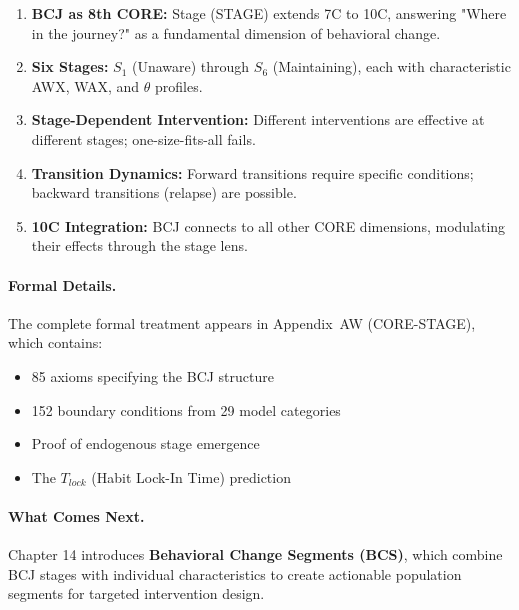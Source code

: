 \begin{enumerate}
    \item \textbf{BCJ as 8th CORE:} Stage (STAGE) extends 7C to 10C, answering
          "Where in the journey?" as a fundamental dimension of behavioral change.

    \item \textbf{Six Stages:} $S_1$ (Unaware) through $S_6$ (Maintaining), each
          with characteristic AWX, WAX, and $\theta$ profiles.

    \item \textbf{Stage-Dependent Intervention:} Different interventions are
          effective at different stages; one-size-fits-all fails.

    \item \textbf{Transition Dynamics:} Forward transitions require specific
          conditions; backward transitions (relapse) are possible.

    \item \textbf{10C Integration:} BCJ connects to all other CORE dimensions,
          modulating their effects through the stage lens.
\end{enumerate}

\paragraph{Formal Details.}
The complete formal treatment appears in Appendix~AW (CORE-STAGE), which contains:
\begin{itemize}
    \item 85 axioms specifying the BCJ structure
    \item 152 boundary conditions from 29 model categories
    \item Proof of endogenous stage emergence
    \item The $T_{lock}$ (Habit Lock-In Time) prediction
\end{itemize}

\paragraph{What Comes Next.}
Chapter 14 introduces \textbf{Behavioral Change Segments (BCS)}, which combine
BCJ stages with individual characteristics to create actionable population
segments for targeted intervention design.

